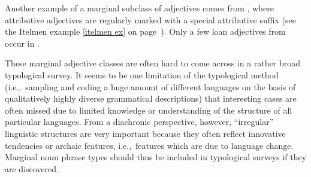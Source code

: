 Another example of a marginal subclass of adjectives comes from , where attributive adjectives are regularly marked with a special attributive suffix (see the Itelmen example \ref{itelmen ex} on page~\pageref{itelmen synchr}). Only a few loan adjectives from  occur in  \citep[60–71]{volodin1997}.

These marginal adjective classes are often hard to come across in a rather broad typological survey. It seems to be one limitation of the typological method (i.e.,~sampling and coding a huge amount of different languages on the basis of qualitatively highly diverse grammatical descriptions) that interesting cases are often missed due to limited knowledge or understanding of the structure of all particular languages. From a diachronic perspective, however, “irregular” linguistic structures are very important because they often reflect innovative tendencies or archaic features, i.e.,~features which are due to language change. Marginal noun phrase types should thus be included in typological surveys if they are discovered.

